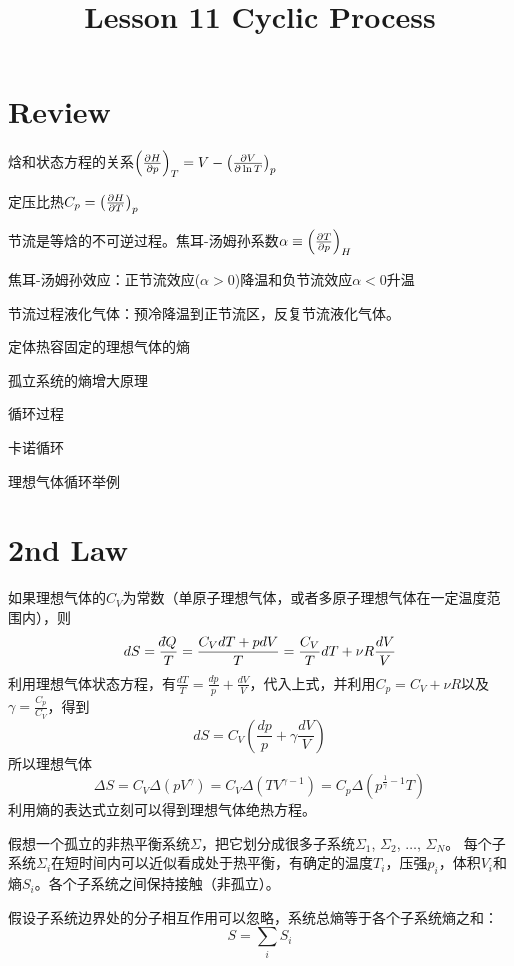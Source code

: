 \documentclass[CJK]{beamer}
\title{Lesson 11 Cyclic Process}
\author{}
\date{}
\begin{document}

\section{Review}

\begin{frame}
\bch 
\bitem
\item{焓和状态方程的关系$\left(\frac{\partial H}{\partial p}\right)_{T} = V - \left(\frac{\partial V}{\partial \ln T}\right)_{p}$}
\item{定压比热$C_p = \left(\frac{\partial H}{\partial T}\right)_{p}$}
\item{节流是等焓的不可逆过程。焦耳-汤姆孙系数$\alpha \equiv \left(\frac{\partial T}{\partial p}\right)_{H}$}
\item{焦耳-汤姆孙效应：正节流效应($\alpha >0$)降温和负节流效应$\alpha<0$升温}
\item{节流过程液化气体：预冷降温到正节流区，反复节流液化气体。}
\eitem
\ech
\end{frame}

\begin{frame}
\bch
\bitem
\item{定体热容固定的理想气体的熵}
\item{孤立系统的熵增大原理}
\item{循环过程}
\item{卡诺循环}
\item{理想气体循环举例}
\eitem
\ech
\end{frame}

\section{2nd Law}

\begin{frame}
\bch
如果理想气体的$C_V$为常数（单原子理想气体，或者多原子理想气体在一定温度范围内），则
$$ dS = \frac{\dbar Q}{T} = \frac{C_VdT +  p dV}{T} = \frac{C_V}{T}dT + \nu R\frac{dV}{V} $$
利用理想气体状态方程，有$\frac{dT}{T} = \frac{dp}{p}+\frac{dV}{V}$，代入上式，并利用$C_p = C_V+\nu R$以及$\gamma = \frac{C_p}{C_V}$，得到
$$ dS = C_V \left(\frac{dp}{p} + \gamma \frac{dV}{V}\right)$$
所以{\blue 理想气体 
$$ \Delta S = C_V \Delta \left(pV^\gamma\right) = C_V\Delta\left(TV^{\gamma-1}\right) = C_p\Delta\left(p^{\frac{1}{\gamma}-1}T\right)$$
}
利用熵的表达式立刻可以得到理想气体绝热方程。

\ech
\end{frame}




\begin{frame}
\bch
假想一个孤立的非热平衡系统$\Sigma$，把它划分成很多子系统$\Sigma_1$, $\Sigma_2$, $\ldots$, $\Sigma_N$。
每个子系统$\Sigma_i$在短时间内可以近似看成处于热平衡，有确定的温度$T_i$，压强$p_i$，体积$V_i$和熵$S_i$。各个子系统之间保持接触（非孤立）。

\skiplines


假设子系统边界处的分子相互作用可以忽略，系统总熵等于各个子系统熵之和：
$$S = \sum_i S_i$$
\ech
\end{frame}
\end{document}
